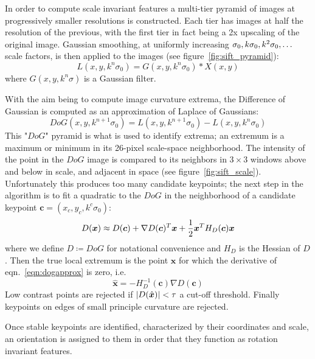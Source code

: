In order to compute scale invariant features a multi-tier pyramid of images at progressively smaller resolutions is constructed.
%
Each tier has images at half the resolution of the previous, with the first tier in fact being a 2x upscaling of the original image.
%
Gaussian smoothing, at uniformly increasing $\sigma_0, k \sigma_0, k^2 \sigma_0, \mathellipsis$ scale factors, is then applied to the images (see figure~\ref{fig:sift_pyramid}):
\begin{equation}
    L(x,y,k^n\sigma_0) = G(x,y,k^n\sigma_0) \ast X(x,y)
\end{equation}
where $G(x,y,k^n\sigma)$ is a Gaussian filter.

With the aim being to compute image curvature extrema, the Difference of Gaussian is computed as an approximation of Laplace of Gaussians:
\begin{equation}
    DoG(x,y,k^{n+1}\sigma_0) = L(x,y,k^{n+1}\sigma_0) - L(x,y,k^n\sigma_0)
\end{equation}
This "$DoG$" pyramid is what is used to identify extrema; an extremum is a maximum or minimum in its 26-pixel scale-space neighborhood.
%
The intensity of the point in the $DoG$ image is compared to its neighbors in $3 \times 3$ windows above and below in scale, and adjacent in space (see figure~\ref{fig:sift_scale}).
%
Unfortunately this produces too many candidate keypoints; the next step in the algorithm is to fit a quadratic to the $DoG$ in the neighborhood of a candidate keypoint $\bm{c} = (x_c, y_c, k^c\sigma_0)$:
\begin{equation}
    D(\bx) \approx D(\bm{c}) + \nabla D(\bm{c})^T \bx + \frac{1}{2}\bx^T H_{D}(\bm{c}) \bx
    \label{eqn:dogapprox}
\end{equation}
where we define $D \coloneqq DoG$ for notational convenience and $H_D$ is the Hessian of $D$.
%
Then the true local extremum is the point $\hat{\bm{x}}$ for which the derivative of eqn.~\eqref{eqn:dogapprox} is zero, i.e.
\begin{equation}
    \hat{\bm{x}} = -H_{D}^{-1}(\bm{c}) \nabla D(\bm{c})
\end{equation}
Low contrast points are rejected if $|D(\hat{\bm{x}})| < \tau$ a cut-off threshold.
%
Finally keypoints on edges of small principle curvature are rejected.

Once stable keypoints are identified, characterized by their coordinates and scale, an orientation is assigned to them in order that they function as rotation invariant features.
%

